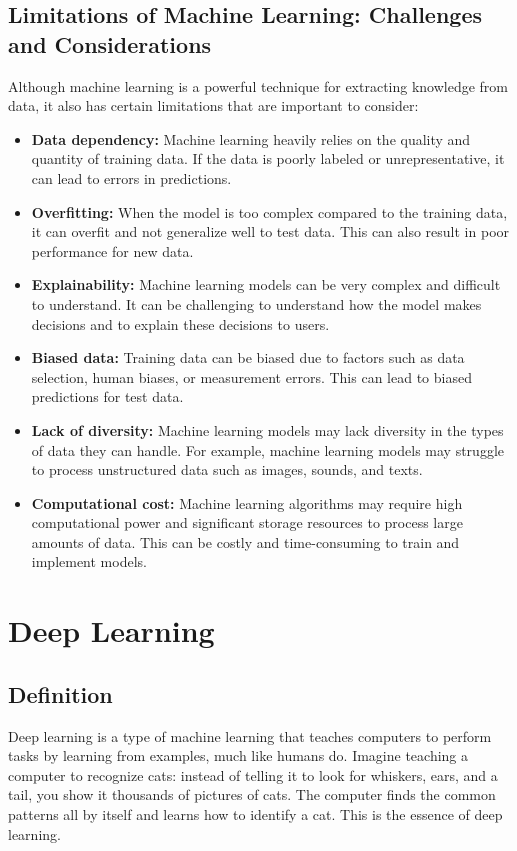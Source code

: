 \subsection{Limitations of Machine Learning: Challenges and Considerations}

Although machine learning is a powerful technique for extracting knowledge from data, it also has certain limitations that are important to consider:

\begin{itemize}
    \item{\textbf{Data dependency:} Machine learning heavily relies on the quality and quantity of training data. If the data is poorly labeled or unrepresentative, it can lead to errors in predictions.}
    \item{\textbf{Overfitting:} When the model is too complex compared to the training data, it can overfit and not generalize well to test data. This can also result in poor performance for new data.}
    \item{\textbf{Explainability:} Machine learning models can be very complex and difficult to understand. It can be challenging to understand how the model makes decisions and to explain these decisions to users.}
    \item{\textbf{Biased data:} Training data can be biased due to factors such as data selection, human biases, or measurement errors. This can lead to biased predictions for test data.}
    \item{\textbf{Lack of diversity:} Machine learning models may lack diversity in the types of data they can handle. For example, machine learning models may struggle to process unstructured data such as images, sounds, and texts.}
    \item{\textbf{Computational cost:} Machine learning algorithms may require high computational power and significant storage resources to process large amounts of data. This can be costly and time-consuming to train and implement models.}
\end{itemize}


\section{Deep Learning}

\subsection{Definition}

Deep learning is a type of machine learning that teaches computers to perform tasks by learning from examples, much like humans do. Imagine teaching a computer to recognize cats: instead of telling it to look for whiskers, ears, and a tail, you show it thousands of pictures of cats. The computer finds the common patterns all by itself and learns how to identify a cat. This is the essence of deep learning.

